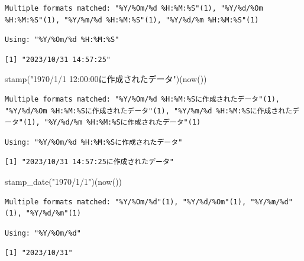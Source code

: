 \documentclass[
  letterpaper,
  DIV=11,
  numbers=noendperiod]{scrreprt}
\newenvironment{Shaded}{\begin{snugshade}}{\end{snugshade}}
\newcommand{\FunctionTok}[1]{\textcolor[rgb]{0.28,0.35,0.67}{#1}}
\newcommand{\NormalTok}[1]{\textcolor[rgb]{0.00,0.23,0.31}{#1}}
\newcommand{\StringTok}[1]{\textcolor[rgb]{0.13,0.47,0.30}{#1}}
\begin{document}
\begin{verbatim}
Multiple formats matched: "%Y/%Om/%d %H:%M:%S"(1), "%Y/%d/%Om %H:%M:%S"(1), "%Y/%m/%d %H:%M:%S"(1), "%Y/%d/%m %H:%M:%S"(1)
\end{verbatim}

\begin{verbatim}
Using: "%Y/%Om/%d %H:%M:%S"
\end{verbatim}

\begin{verbatim}
[1] "2023/10/31 14:57:25"
\end{verbatim}

\begin{Shaded}
\begin{Highlighting}[]
\FunctionTok{stamp}\NormalTok{(}\StringTok{"1970/1/1 12:00:00に作成されたデータ"}\NormalTok{)(}\FunctionTok{now}\NormalTok{())}
\end{Highlighting}
\end{Shaded}

\begin{verbatim}
Multiple formats matched: "%Y/%Om/%d %H:%M:%Sに作成されたデータ"(1), "%Y/%d/%Om %H:%M:%Sに作成されたデータ"(1), "%Y/%m/%d %H:%M:%Sに作成されたデータ"(1), "%Y/%d/%m %H:%M:%Sに作成されたデータ"(1)
\end{verbatim}

\begin{verbatim}
Using: "%Y/%Om/%d %H:%M:%Sに作成されたデータ"
\end{verbatim}

\begin{verbatim}
[1] "2023/10/31 14:57:25に作成されたデータ"
\end{verbatim}

\begin{Shaded}
\begin{Highlighting}[]
\FunctionTok{stamp\_date}\NormalTok{(}\StringTok{"1970/1/1"}\NormalTok{)(}\FunctionTok{now}\NormalTok{())}
\end{Highlighting}
\end{Shaded}

\begin{verbatim}
Multiple formats matched: "%Y/%Om/%d"(1), "%Y/%d/%Om"(1), "%Y/%m/%d"(1), "%Y/%d/%m"(1)
\end{verbatim}

\begin{verbatim}
Using: "%Y/%Om/%d"
\end{verbatim}

\begin{verbatim}
[1] "2023/10/31"
\end{verbatim}
\end{document}
